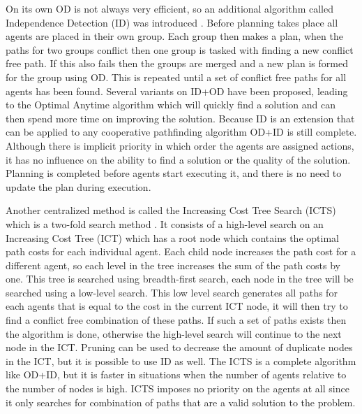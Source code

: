 On its own OD is not always very efficient, so an additional algorithm called
Independence Detection (ID) was introduced \cite{standley2010}. Before planning
takes place all agents are placed in their own group. Each group then makes a
plan, when the paths for two groups conflict then one group is tasked with
finding a new conflict free path. If this also fails then the groups are merged
and a new plan is formed for the group using OD. This is repeated until a
set of conflict free paths for all agents has been found. Several variants on
ID+OD have been proposed, leading to the Optimal Anytime algorithm
\cite{standley2011} which will quickly find a solution and can then spend more
time on improving the solution. Because ID is an extension that can be applied
to any cooperative pathfinding algorithm OD+ID is still complete. Although
there is implicit priority in which order the agents are assigned actions, it
has no influence on the ability to find a solution or the quality of the
solution. Planning is completed before agents start executing it, and there is
no need to update the plan during execution.

Another centralized method is called the Increasing Cost Tree Search (ICTS)
which is a
two-fold search method \cite{sharon2013}. It consists of a high-level search on
an Increasing Cost Tree (ICT) which has a root node which contains the optimal
path costs for each individual agent. Each child node increases the path cost
for a different agent, so each level in the tree increases the sum of the path
costs by one. This tree is searched using breadth-first search, each node in
the tree will be searched using a low-level search. This low level search
generates all paths for each agents that is equal to the cost in the current
ICT node, it will then try to find a conflict free combination of these paths.
If such a set of paths exists then the algorithm is done, otherwise the
high-level search will continue to the next node in the ICT. Pruning can be
used to decrease the amount of duplicate nodes in the ICT, but it is possible
to use ID as well. The ICTS is a complete algorithm like OD+ID, but it is
faster in situations when the number of agents relative to the number of nodes
is high. ICTS imposes no priority on the agents at all since it only searches
for combination of paths that are a valid solution to the problem.

